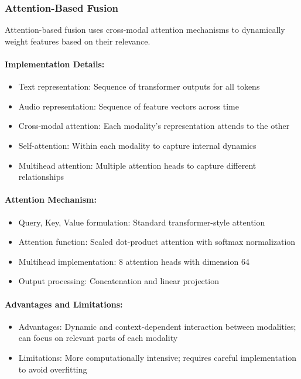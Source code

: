 \documentclass[12pt]{article}
\begin{document}
\subsubsection{Attention-Based Fusion}
Attention-based fusion uses cross-modal attention mechanisms to dynamically weight features based on their relevance.

\paragraph{Implementation Details:}
\begin{itemize}
    \item Text representation: Sequence of transformer outputs for all tokens
    \item Audio representation: Sequence of feature vectors across time
    \item Cross-modal attention: Each modality's representation attends to the other
    \item Self-attention: Within each modality to capture internal dynamics
    \item Multihead attention: Multiple attention heads to capture different relationships
\end{itemize}

\paragraph{Attention Mechanism:}
\begin{itemize}
    \item Query, Key, Value formulation: Standard transformer-style attention
    \item Attention function: Scaled dot-product attention with softmax normalization
    \item Multihead implementation: 8 attention heads with dimension 64
    \item Output processing: Concatenation and linear projection
\end{itemize}

\paragraph{Advantages and Limitations:}
\begin{itemize}
    \item Advantages: Dynamic and context-dependent interaction between modalities; can focus on relevant parts of each modality
    \item Limitations: More computationally intensive; requires careful implementation to avoid overfitting
\end{itemize}
\end{document}
